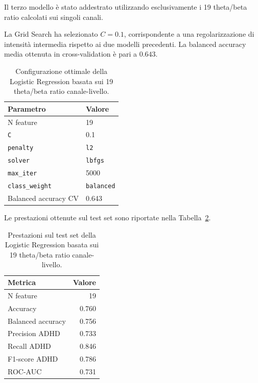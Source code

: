 Il terzo modello è stato addestrato utilizzando esclusivamente i
19 theta/beta ratio calcolati sui singoli canali.

La Grid Search ha selezionato $C=0.1$, corrispondente a una
regolarizzazione di intensità intermedia rispetto ai due modelli
precedenti. La balanced accuracy media ottenuta in cross-validation
è pari a $0.643$.

\begin{table}[H]
	\centering
	\begin{tabular}{ll}
		\hline
		\textbf{Parametro} & \textbf{Valore} \\
		\hline
		N feature & 19 \\
		\texttt{C} & 0.1 \\
		\texttt{penalty} & \texttt{l2} \\
		\texttt{solver} & \texttt{lbfgs} \\
		\texttt{max\_iter} & 5000 \\
		\texttt{class\_weight} & \texttt{balanced} \\
		Balanced accuracy CV & 0.643 \\
		\hline
	\end{tabular}
	\caption{Configurazione ottimale della Logistic Regression
		basata sui 19 theta/beta ratio canale-livello.}
	\label{tab:logreg_tbr_hyperparameters}
\end{table}

Le prestazioni ottenute sul test set sono riportate nella
Tabella~\ref{tab:logreg_tbr_test}.

\begin{table}[H]
	\centering
	\begin{tabular}{lr}
		\hline
		\textbf{Metrica} & \textbf{Valore} \\
		\hline
		N feature & 19 \\
		Accuracy & 0.760 \\
		Balanced accuracy & 0.756 \\
		Precision ADHD & 0.733 \\
		Recall ADHD & 0.846 \\
		F1-score ADHD & 0.786 \\
		ROC-AUC & 0.731 \\
		\hline
	\end{tabular}
	\caption{Prestazioni sul test set della Logistic Regression
		basata sui 19 theta/beta ratio canale-livello.}
	\label{tab:logreg_tbr_test}
\end{table}

